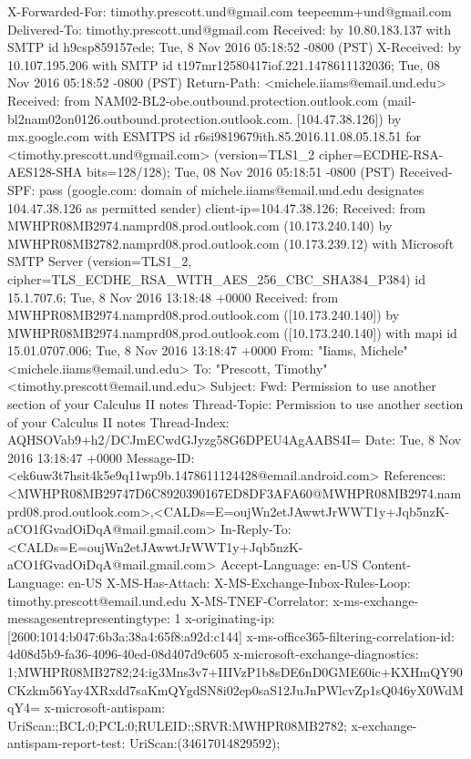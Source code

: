 X-Forwarded-For: timothy.prescott.und@gmail.com teepeemm+und@gmail.com
Delivered-To: timothy.prescott.und@gmail.com
Received: by 10.80.183.137 with SMTP id h9csp859157ede;
        Tue, 8 Nov 2016 05:18:52 -0800 (PST)
X-Received: by 10.107.195.206 with SMTP id t197mr12580417iof.221.1478611132036;
        Tue, 08 Nov 2016 05:18:52 -0800 (PST)
Return-Path: <michele.iiams@email.und.edu>
Received: from NAM02-BL2-obe.outbound.protection.outlook.com (mail-bl2nam02on0126.outbound.protection.outlook.com. [104.47.38.126])
        by mx.google.com with ESMTPS id r6si9819679ith.85.2016.11.08.05.18.51
        for <timothy.prescott.und@gmail.com>
        (version=TLS1_2 cipher=ECDHE-RSA-AES128-SHA bits=128/128);
        Tue, 08 Nov 2016 05:18:51 -0800 (PST)
Received-SPF: pass (google.com: domain of michele.iiams@email.und.edu designates 104.47.38.126 as permitted sender) client-ip=104.47.38.126;
Received: from MWHPR08MB2974.namprd08.prod.outlook.com (10.173.240.140) by MWHPR08MB2782.namprd08.prod.outlook.com (10.173.239.12) with Microsoft SMTP Server (version=TLS1_2, cipher=TLS_ECDHE_RSA_WITH_AES_256_CBC_SHA384_P384) id 15.1.707.6; Tue, 8 Nov 2016 13:18:48 +0000
Received: from MWHPR08MB2974.namprd08.prod.outlook.com ([10.173.240.140]) by MWHPR08MB2974.namprd08.prod.outlook.com ([10.173.240.140]) with mapi id 15.01.0707.006; Tue, 8 Nov 2016 13:18:47 +0000
From: "Iiams, Michele" <michele.iiams@email.und.edu>
To: "Prescott, Timothy" <timothy.prescott@email.und.edu>
Subject: Fwd: Permission to use another section of your Calculus II notes
Thread-Topic: Permission to use another section of your Calculus II notes
Thread-Index: AQHSOVab9+h2/DCJmECwdGJyzg58G6DPEU4AgAABS4I=
Date: Tue, 8 Nov 2016 13:18:47 +0000
Message-ID: <ek6uw3t7hsit4k5e9q11wp9b.1478611124428@email.android.com>
References: <MWHPR08MB29747D6C8920390167ED8DF3AFA60@MWHPR08MB2974.namprd08.prod.outlook.com>,<CALDs=E=oujWn2etJAwwtJrWWT1y+Jqb5nzK-aCO1fGvadOiDqA@mail.gmail.com>
In-Reply-To: <CALDs=E=oujWn2etJAwwtJrWWT1y+Jqb5nzK-aCO1fGvadOiDqA@mail.gmail.com>
Accept-Language: en-US
Content-Language: en-US
X-MS-Has-Attach: 
X-MS-Exchange-Inbox-Rules-Loop: timothy.prescott@email.und.edu
X-MS-TNEF-Correlator: 
x-ms-exchange-messagesentrepresentingtype: 1
x-originating-ip: [2600:1014:b047:6b3a:38a4:65f8:a92d:c144]
x-ms-office365-filtering-correlation-id: 4d08d5b9-fa36-4096-40ed-08d407d9c605
x-microsoft-exchange-diagnostics: 1;MWHPR08MB2782;24:ig3Mns3v7+IIIVzP1b8sDE6nD0GME60ic+KXHmQY90CKzkm56Yay4XRxdd7saKmQYgdSN8i02ep0saS12JuJnPWlcvZp1sQ046yX0WdMqY4=
x-microsoft-antispam: UriScan:;BCL:0;PCL:0;RULEID:;SRVR:MWHPR08MB2782;
x-exchange-antispam-report-test: UriScan:(34617014829592);
